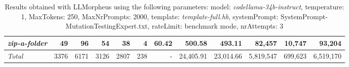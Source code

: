 \begin{table*}
{\begin{tabular}{l||r|r|r|r|r|r||r|r||r|r|r}
   \hline
   \textit{zip-a-folder} & 49 & 96 & 54 & 38 & 4 & 60.42 & 500.58 & 493.11 & 82,457 & 10,747 & 93,204 \\ 
   \hline
   \textit{Total} & 3376 & 6171 & 3126 & 2807 & 238 & - & 24,405.91  & 23,014.66 & 5,819,547 & 699,623 & 6,519,170 \\ 
 \end{tabular}
 }
 \caption{Results obtained with LLMorpheus using the following parameters: 
   model: \textit{codellama-34b-instruct}, 
   temperature: 1, 
   MaxTokens: 250, 
   MaxNrPrompts: 2000, 
   template: \textit{template-full.hb}, 
   systemPrompt: SystemPrompt-MutationTestingExpert.txt, 
   rateLimit: benchmark mode, 
   nrAttempts: 3  
 }
\end{table*}

